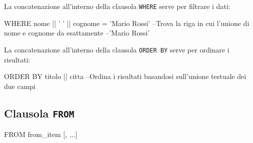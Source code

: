 
\smallskip
La concatenazione all'interno della clausola \texttt{WHERE} serve per filtrare i dati:
\begin{codiceSQL}
WHERE nome || ' ' || cognome = 'Mario Rossi'
--Trova la riga in cui l'unione di nome e cognome da esattamente 
--'Mario Rossi'
\end{codiceSQL}

\smallskip
La concatenazione all'interno della clausola \texttt{ORDER BY} serve per ordinare i risultati:
\begin{codiceSQL}
ORDER BY titolo || citta
--Ordina i risultati basandosi sull'unione testuale dei due campi
\end{codiceSQL}


\subsection{Clausola \texttt{FROM}}
\begin{codiceSQL}
FROM from_item [, ...]
\end{codiceSQL}

